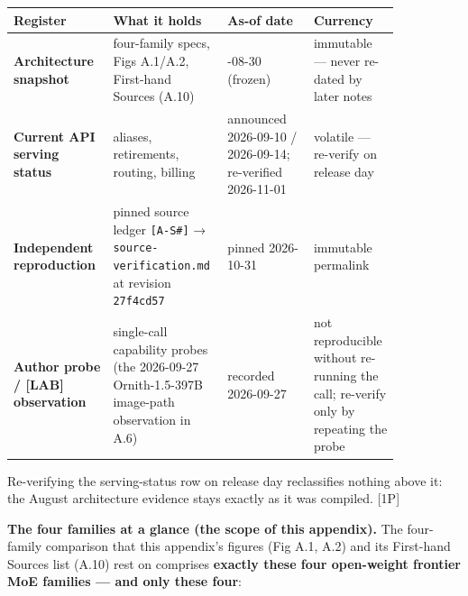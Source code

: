 \nopagebreak[4]
\begin{longtable}[]{@{}
  >{\raggedright\arraybackslash}p{0.2127\linewidth}
  >{\raggedright\arraybackslash}p{0.2127\linewidth}
  >{\raggedright\arraybackslash}p{0.2127\linewidth}
  >{\raggedright\arraybackslash}p{0.2127\linewidth}@{}}
\toprule\noalign{}
\begin{minipage}[b]{\linewidth}\raggedright
Register
\end{minipage} & \begin{minipage}[b]{\linewidth}\raggedright
What it holds
\end{minipage} & \begin{minipage}[b]{\linewidth}\raggedright
As-of date
\end{minipage} & \begin{minipage}[b]{\linewidth}\raggedright
Currency
\end{minipage} \\
\midrule\noalign{}
\endhead
\bottomrule\noalign{}
\endlastfoot
\textbf{Architecture snapshot} & four-family specs, Figs A.1/A.2,
First-hand Sources (A.10) & 2026-08-30 (frozen) & immutable --- never
re-dated by later notes \\
\noalign{\label{tab:27.1}}
\textbf{Current API serving status} & aliases, retirements, routing,
billing & announced 2026-09-10 / 2026-09-14; re-verified 2026-11-01 &
volatile --- re-verify on release day \\
\textbf{Independent reproduction} & pinned source ledger
\texttt{{[}A-S\#{]}} → \texttt{source-verification.md} at revision
\texttt{27f4cd57} & pinned 2026-10-31 & immutable permalink \\
\textbf{Author probe / \mbox{{[}LAB{]}} observation} & single-call capability
probes (the 2026-09-27 Ornith-1.5-397B image-path observation in A.6) &
recorded 2026-09-27 & not reproducible without re-running the call;
re-verify only by repeating the probe \\
\end{longtable}

Re-verifying the serving-status row on release day reclassifies nothing
above it: the August architecture evidence stays exactly as it was
compiled. \mbox{{[}1P{]}}

\textbf{The four families at a glance (the scope of this appendix).} The
four-family comparison that this appendix's figures (Fig A.1, A.2) and
its First-hand Sources list (A.10) rest on comprises \textbf{exactly
these four open-weight frontier MoE families --- and only these four}:

